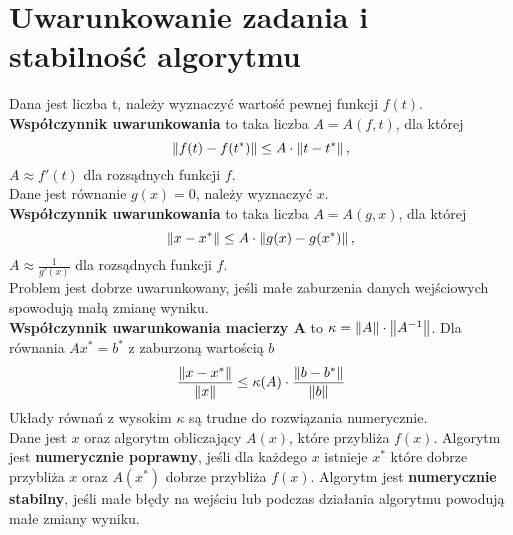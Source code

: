 \section{Uwarunkowanie zadania i stabilność algorytmu}
Dana jest liczba t, należy wyznaczyć wartość pewnej funkcji \( f(t) \). \\
\textbf{Współczynnik uwarunkowania} to taka liczba \( A = A(f,t) \), dla której
\[
	\left\Vert f(t) - f(t^*) \right\Vert \leq  A\cdot\left\Vert t - t^* \right\Vert,
\]
\( A \approx f'(t) \) dla rozsądnych funkcji \( f \). \\

\noindent
Dane jest równanie \( g(x) = 0 \), należy wyznaczyć \( x \). \\
\textbf{Współczynnik uwarunkowania} to taka liczba \( A = A(g,x) \), dla której
\[
	\left\Vert x - x^* \right\Vert \leq  A\cdot\left\Vert g(x) - g(x^*) \right\Vert,
\]
\( A \approx \frac{1}{g'(x)} \) dla rozsądnych funkcji \( f \). \\
Problem jest dobrze uwarunkowany, jeśli małe zaburzenia
danych wejściowych spowodują małą zmianę wyniku. \\

\noindent
\textbf{Współczynnik uwarunkowania macierzy A} to \( \kappa = \left\Vert A \right\Vert \cdot \left\Vert A^{-1} \right\Vert \). Dla równania \( Ax^* = b^* \) z zaburzoną wartością \( b \)
\[
	\frac{\left\Vert x-x^* \right\Vert}{\left\Vert x \right\Vert} \leq \kappa(A) \cdot \frac{\left\Vert b-b^* \right\Vert}{\left\Vert b \right\Vert}
\]
Układy równań z wysokim \( \kappa \) są trudne do rozwiązania numerycznie. \\

\noindent
Dane jest \( x \) oraz algorytm obliczający \( A(x) \), które przybliża \( f(x) \). Algorytm jest \textbf{numerycznie poprawny}, jeśli dla każdego \( x \) istnieje \( x^* \) które dobrze przybliża \( x \) oraz \( A(x^*) \) dobrze przybliża \( f(x) \).
Algorytm jest \textbf{numerycznie stabilny}, jeśli małe błędy na wejściu
lub podczas działania algorytmu powodują małe zmiany wyniku.
